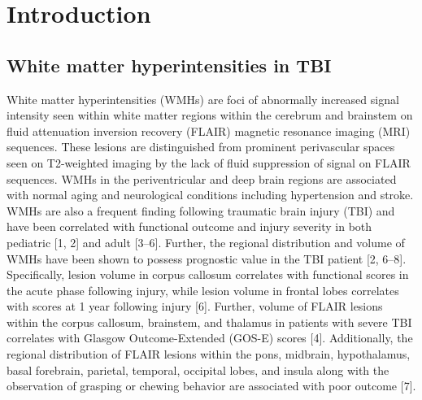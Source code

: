 \documentclass[11pt,]{article}
\title{}
\author{}
\date{}
\begin{document}
\maketitle


\section{Introduction}\label{introduction}

\subsection{White matter hyperintensities in
TBI}\label{white-matter-hyperintensities-in-tbi}

White matter hyperintensities (WMHs) are foci of abnormally increased
signal intensity seen within white matter regions within the cerebrum
and brainstem on fluid attenuation inversion recovery (FLAIR) magnetic
resonance imaging (MRI) sequences. These lesions are distinguished from
prominent perivascular spaces seen on T2-weighted imaging by the lack of
fluid suppression of signal on FLAIR sequences. WMHs in the
periventricular and deep brain regions are associated with normal aging
and neurological conditions including hypertension and stroke. WMHs are
also a frequent finding following traumatic brain injury (TBI) and have
been correlated with functional outcome and injury severity in both
pediatric {[}1, 2{]} and adult {[}3--6{]}. Further, the regional
distribution and volume of WMHs have been shown to possess prognostic
value in the TBI patient {[}2, 6--8{]}. Specifically, lesion volume in
corpus callosum correlates with functional scores in the acute phase
following injury, while lesion volume in frontal lobes correlates with
scores at 1 year following injury {[}6{]}. Further, volume of FLAIR
lesions within the corpus callosum, brainstem, and thalamus in patients
with severe TBI correlates with Glasgow Outcome-Extended (GOS-E) scores
{[}4{]}. Additionally, the regional distribution of FLAIR lesions within
the pons, midbrain, hypothalamus, basal forebrain, parietal, temporal,
occipital lobes, and insula along with the observation of grasping or
chewing behavior are associated with poor outcome {[}7{]}.
\end{document}
